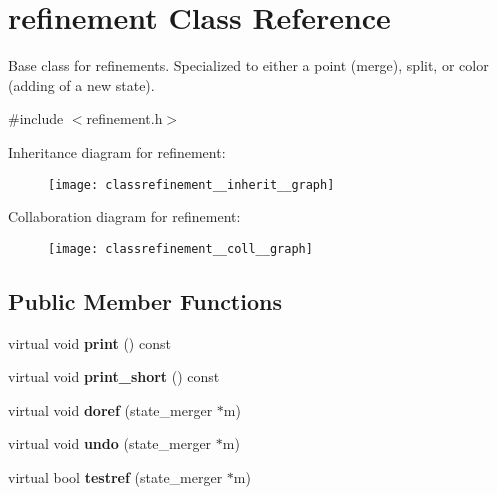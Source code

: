 \hypertarget{classrefinement}{}\section{refinement Class Reference}
\label{classrefinement}


Base class for refinements. Specialized to either a point (merge), split, or color (adding of a new state).  




{\ttfamily \#include $<$refinement.\+h$>$}



Inheritance diagram for refinement\+:
\nopagebreak
\begin{figure}[H]
\begin{center}
\leavevmode
\texttt{[image: classrefinement\_\_inherit\_\_graph]}
\end{center}
\end{figure}


Collaboration diagram for refinement\+:
\nopagebreak
\begin{figure}[H]
\begin{center}
\leavevmode
\texttt{[image: classrefinement\_\_coll\_\_graph]}
\end{center}
\end{figure}
\subsection*{Public Member Functions}
\begin{DoxyCompactItemize}
\item 
\mbox{\label{classrefinement_aa4bbc17b1f7e2f01ef453ae7b8ef21fa}} 
virtual void {\bfseries print} () const
\item 
\mbox{\label{classrefinement_a361b2a09417e236493ebd17367d4715a}} 
virtual void {\bfseries print\+\_\+short} () const
\item 
\mbox{\label{classrefinement_a3927f962be48969209071fff60a92e6d}} 
virtual void {\bfseries doref} (state\+\_\+merger $\ast$m)
\item 
\mbox{\label{classrefinement_a77bfd65c7d57546bfeb04ba7dacbf066}} 
virtual void {\bfseries undo} (state\+\_\+merger $\ast$m)
\item 
\mbox{\label{classrefinement_a6d37805eb5ae4597ceb18aee77a574b8}} 
virtual bool {\bfseries testref} (state\+\_\+merger $\ast$m)
\end{DoxyCompactItemize}
